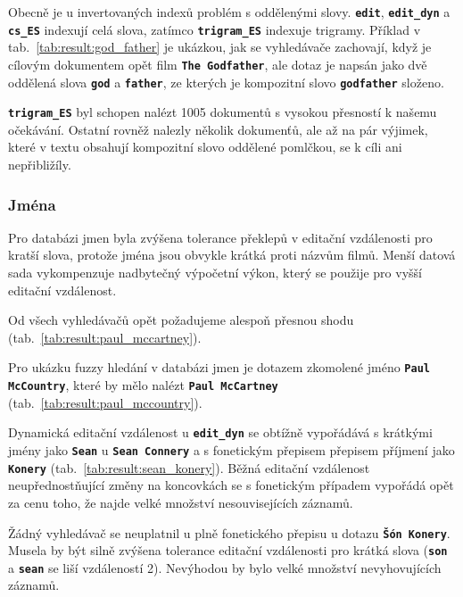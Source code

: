 \documentclass[11pt,letterpaper,oneside,openright]{book}
\newcommand{\bftt}[1]{\texttt{\textbf{#1}}}
\begin{document}
\mbox{}\mbox{}

Obecně je u invertovaných indexů problém s oddělenými slovy. \bftt{edit},
\bftt{edit\_dyn} a \bftt{cs\_ES} indexují celá slova, zatímco
\bftt{trigram\_ES} indexuje trigramy. Příklad v
tab.~\ref{tab:result:god_father} je ukázkou, jak se vyhledávače zachovají, když
je cílovým dokumentem opět film \bftt{The Godfather}, ale dotaz je napsán jako
dvě oddělená slova \bftt{god} a \bftt{father}, ze kterých je kompozitní slovo
\bftt{godfather} složeno.

\bftt{trigram\_ES} byl schopen nalézt 1005 dokumentů s vysokou přesností k
našemu očekávání. Ostatní rovněž nalezly několik dokumenťů, ale až na pár
výjimek, které v textu obsahují kompozitní slovo oddělené pomlčkou, se k cíli
ani nepřibližíly.

\subsubsection{Jména}
Pro databázi jmen byla zvýšena tolerance překlepů v editační vzdálenosti pro
kratší slova, protože jména jsou obvykle krátká proti názvům filmů. Menší
datová sada vykompenzuje nadbytečný výpočetní výkon, který se použije pro vyšší
editační vzdálenost.

\mbox{}\mbox{}

Od všech vyhledávačů opět požadujeme alespoň přesnou shodu
(tab.~\ref{tab:result:paul_mccartney}).

\mbox{}\mbox{}

Pro ukázku fuzzy hledání v databázi jmen je dotazem zkomolené jméno
\bftt{Paul McCountry}, které by mělo nalézt \bftt{Paul McCartney}
(tab.~\ref{tab:result:paul_mccountry}).

\mbox{}\mbox{}

Dynamická editační vzdálenost u \bftt{edit\_dyn} se obtížně vypořádává s
krátkými jmény jako \bftt{Sean} u \bftt{Sean Connery} a s fonetickým přepisem
přepisem příjmení jako \bftt{Konery} (tab.~\ref{tab:result:sean_konery}). Běžná
editační vzdálenost neupřednostňující změny na koncovkách se s fonetickým
případem vypořádá opět za cenu toho, že najde velké množství nesouvisejících
záznamů.

Žádný vyhledávač se neuplatnil u plně fonetického přepisu u dotazu \bftt{Šón
Konery}. Musela by být silně zvýšena tolerance editační vzdálenosti pro krátká
slova (\bftt{son} a \bftt{sean} se liší vzdáleností 2). Nevýhodou by bylo velké
množství nevyhovujících záznamů.
\end{document}
